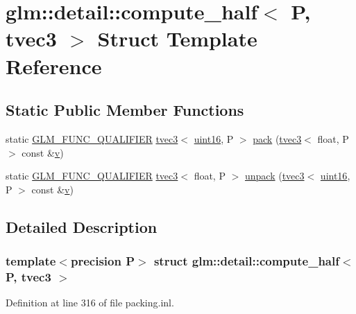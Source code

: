 \hypertarget{structglm_1_1detail_1_1compute__half_3_01_p_00_01tvec3_01_4}{}\section{glm\+::detail\+::compute\+\_\+half$<$ P, tvec3 $>$ Struct Template Reference}
\label{structglm_1_1detail_1_1compute__half_3_01_p_00_01tvec3_01_4}
\subsection*{Static Public Member Functions}
\begin{DoxyCompactItemize}
\item 
static \mbox{\hyperlink{setup_8hpp_a33fdea6f91c5f834105f7415e2a64407}{G\+L\+M\+\_\+\+F\+U\+N\+C\+\_\+\+Q\+U\+A\+L\+I\+F\+I\+ER}} \mbox{\hyperlink{structglm_1_1tvec3}{tvec3}}$<$ \mbox{\hyperlink{namespaceglm_1_1detail_a47b2a7d006d187338e8031a352d1ce56}{uint16}}, P $>$ \mbox{\hyperlink{structglm_1_1detail_1_1compute__half_3_01_p_00_01tvec3_01_4_a329d076df25a395e8d4872384ca17221}{pack}} (\mbox{\hyperlink{structglm_1_1tvec3}{tvec3}}$<$ float, P $>$ const \&\mbox{\hyperlink{glad_8h_a14cfbe2fc2234f5504618905b69d1e06}{v}})
\item 
static \mbox{\hyperlink{setup_8hpp_a33fdea6f91c5f834105f7415e2a64407}{G\+L\+M\+\_\+\+F\+U\+N\+C\+\_\+\+Q\+U\+A\+L\+I\+F\+I\+ER}} \mbox{\hyperlink{structglm_1_1tvec3}{tvec3}}$<$ float, P $>$ \mbox{\hyperlink{structglm_1_1detail_1_1compute__half_3_01_p_00_01tvec3_01_4_a48226a2ef3176a5fbf6bbad330180517}{unpack}} (\mbox{\hyperlink{structglm_1_1tvec3}{tvec3}}$<$ \mbox{\hyperlink{namespaceglm_1_1detail_a47b2a7d006d187338e8031a352d1ce56}{uint16}}, P $>$ const \&\mbox{\hyperlink{glad_8h_a14cfbe2fc2234f5504618905b69d1e06}{v}})
\end{DoxyCompactItemize}


\subsection{Detailed Description}
\subsubsection*{template$<$precision P$>$\newline
struct glm\+::detail\+::compute\+\_\+half$<$ P, tvec3 $>$}



Definition at line 316 of file packing.\+inl.




